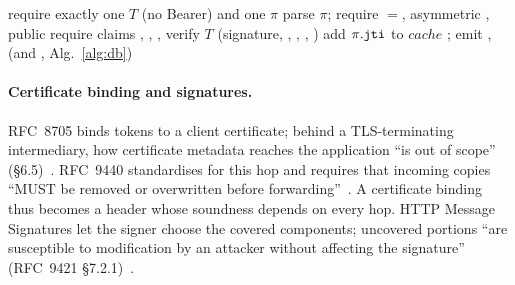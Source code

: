 \begin{algorithm}[t]
\caption{RFC~9449 resource-server check of the reference verifier, on the
view $\view(r)=(m_v,u_v)$ an adapter reconstructs.}\label{alg:verifier}
require exactly one  $T$ (no Bearer) and one  $\pi$\;
parse $\pi$; require $=$, asymmetric , public \;
require claims \jti, \htm, \htu, \iat\;
verify $T$ (signature, , , , )\;
add $\pi.\texttt{jti}$ to $\mathit{cache}$
\KwAllow; emit ,  (and , Alg.~\ref{alg:db})\;
\end{algorithm}

\paragraph{Certificate binding and signatures.} RFC~8705 binds tokens to a
client certificate; behind a TLS-terminating intermediary, how certificate
metadata reaches the application ``is out of scope'' (\S6.5)~\cite{rfc8705}.
RFC~9440 standardises  for this hop and requires that
incoming copies ``MUST be removed or overwritten before forwarding''~\cite{rfc9440}.
A certificate binding thus becomes a header whose soundness depends on every
hop. HTTP Message Signatures let the signer choose the covered components;
uncovered portions ``are susceptible to modification by an attacker without
affecting the signature'' (RFC~9421 \S7.2.1)~\cite{rfc9421}.

